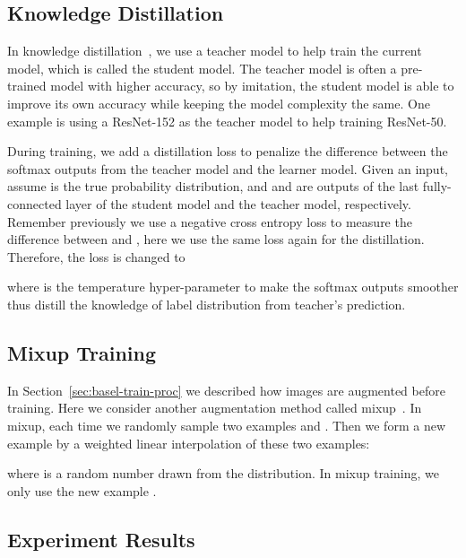 \documentclass[10pt,twocolumn,letterpaper]{article}
\begin{document}
\subsection{Knowledge Distillation}

In knowledge distillation~\cite{hinton2015distilling}, we use a teacher model to
help train the current model, which is called the student model. The teacher
model is often a pre-trained model with higher accuracy, so by imitation, the
student model is able to improve its own accuracy while keeping the model
complexity the same. One example is using a ResNet-152 as the teacher model
to help training ResNet-50. 

During training, we add a distillation loss to penalize the difference between
the softmax outputs from the teacher model and the learner model. Given an input,
assume  is the true probability distribution, and  and  are outputs of
the last fully-connected layer of the student model and the teacher model,
respectively. Remember previously we use a negative cross entropy loss 
to measure the difference between  and , here we use the same loss again for the
distillation. Therefore, the loss is changed to



where  is the temperature hyper-parameter to make the softmax outputs
smoother thus distill the knowledge of label distribution from teacher's prediction.

\subsection{Mixup Training}

In Section~\ref{sec:basel-train-proc} we described how images are augmented
before training. Here we consider another augmentation method called
mixup~\cite{DBLP:journals/corr/abs-1710-09412}. In mixup, each time we randomly
sample two examples  and . Then we form a new example
by a weighted linear interpolation of these two examples:



where  is a random number drawn from the
 distribution. In
mixup training, we only use the new example .

\subsection{Experiment Results}
\label{sec:adv}
\end{document}
